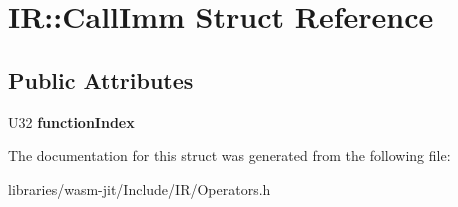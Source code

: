 \hypertarget{struct_i_r_1_1_call_imm}{}\section{IR\+:\+:Call\+Imm Struct Reference}
\label{struct_i_r_1_1_call_imm}
\subsection*{Public Attributes}
\begin{DoxyCompactItemize}
\item 
\mbox{\label{struct_i_r_1_1_call_imm_a79c3a5c31c922ca02ec83673d7f2c9cb}} 
U32 {\bfseries function\+Index}
\end{DoxyCompactItemize}


The documentation for this struct was generated from the following file\+:\begin{DoxyCompactItemize}
\item 
libraries/wasm-\/jit/\+Include/\+I\+R/Operators.\+h\end{DoxyCompactItemize}
